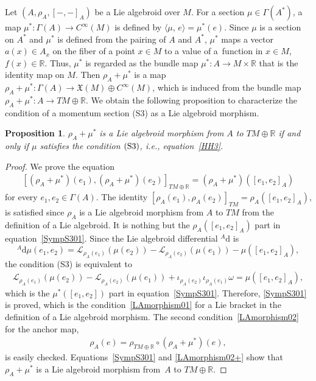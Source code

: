 \documentclass[pdftex]{sigma}
\numberwithin{equation}{section}
\newtheorem{Proposition}[Theorem]{Proposition}
 { \theoremstyle{definition}
\newtheorem{Definition}[Theorem]{Definition}
\newtheorem{Note}[Theorem]{Note}
\newtheorem{Example}[Theorem]{Example}
\newtheorem{Remark}[Theorem]{Remark}
\newtheorem{Question}[Theorem]{Question}
 }
\def\bR{{\mathbb{R}}}
\newcommand{\calL}{{\mathcal L}}
\newcommand{\liebra}[2]{{[{{#1},{#2}}]_{TM \oplus \bR}}}
\newcommand{\rhoa}{{\rho_A}}
\newcommand{\rhotr}{\rho_{TM \oplus \bR}}
\newcommand{\bracket}[2]{\langle #1,\,#2\rangle}
\newcommand{\rd}{\mathrm{d}}
\begin{document}
Let $(A, \rhoa, [-,-]_A)$ be a Lie algebroid over $M$.
For a section $\mu \in \Gamma(A^*)$,
a map $\mu^*\colon\Gamma(A) \rightarrow C^{\infty}(M)$
is defined by $\bracket{\mu}{e} = \mu^*(e)$.
Since $\mu$ is a section on $A^*$ and $\mu^*$ is defined from
the pairing of $A$ and $A^*$, $\mu^*$ maps a vector
$a(x) \in A_x$ on the fiber of a point $x \in M$ to a value of a~function
in $x \in M$, $f(x) \in \bR$.
Thus, $\mu^*$ is regarded as
the bundle map $\mu^*\colon A \rightarrow M \times \bR$ that
is the identity map on $M$.
Then $\rhoa + \mu^*$ is a map
$\rhoa + \mu^*\colon \Gamma(A) \rightarrow \mathfrak{X}(M) \oplus C^{\infty}(M)$,
which is induced from the bundle map
$\rhoa + \mu^*\colon A \rightarrow TM \oplus \bR$.
We obtain the following proposition to characterize the condition of a momentum section (S3) as a Lie algebroid morphism.
\begin{Proposition}\label{SympS3}
$\rhoa + \mu^*$ is a Lie algebroid morphism from $A$ to $TM \oplus \bR$
if and only if $\mu$
satisfies the condition $\rm (S3)$, i.e., equation~\eqref{HH3}.
\end{Proposition}

\begin{proof}
We prove the equation
\begin{gather}\label{SympS301}
\liebra{(\rhoa + \mu^*)(e_1)}{(\rhoa + \mu^*)(e_2)} =
(\rhoa + \mu^*)([e_1, e_2]_A)
\end{gather}
for every $e_1, e_2 \in \Gamma(A)$.
The identity
$[\rhoa(e_1), \rhoa(e_2)]_{TM} = \rhoa([e_1, e_2]_A)$,
is satisfied
since $\rhoa$ is a Lie algebroid morphism from $A$ to $TM$
from the definition of a Lie algebroid.
It is nothing but the $\rhoa([e_1, e_2]_A)$ part in equation~\eqref{SympS301}.
Since the Lie algebroid differential ${}^A \rd$ is
\[
{}^A \rd \mu (e_1, e_2)
=
\calL_{\rhoa(e_1)} (\mu(e_2)) - \calL_{\rhoa(e_2)} (\mu(e_1))
- \mu([e_1, e_2]_A),
\]
the condition (S3) is equivalent to
\begin{gather}
\calL_{\rhoa(e_1)} (\mu(e_2)) - \calL_{\rhoa(e_2)} (\mu(e_1))
+ \iota_{\rhoa(e_2)} \iota_{\rhoa(e_1)} \omega
= \mu([e_1, e_2]_A),
\label{LAmorphism01}
\end{gather}
which is the $\mu^*([e_1, e_2])$ part in equation~\eqref{SympS301}.
Therefore, \eqref{SympS301} is proved, which is the condition~\eqref{LAmorphism01} for a Lie bracket
in the definition of a Lie algebroid morphism.
The second condition~\eqref{LAmorphism02} for the anchor map,
\begin{gather}
\rhoa (e) =\rhotr \circ (\rhoa + \mu^*)(e),
\label{LAmorphism02+}
\end{gather}
is easily checked.
Equations~\eqref{SympS301} and \eqref{LAmorphism02+} show that $\rhoa+\mu^*$ is a Lie algebroid morphism from~$A$ to $TM \oplus \bR$.
\end{proof}
\end{document}
